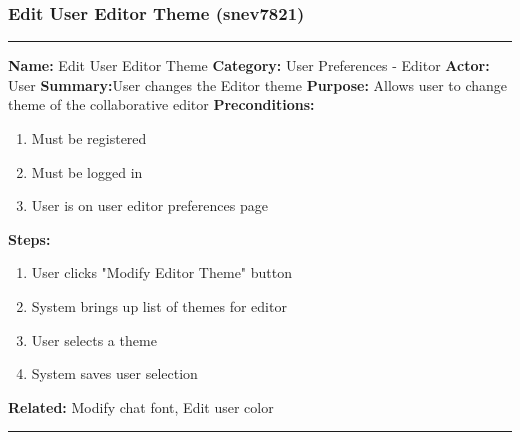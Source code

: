 \documentclass[11pt]{report}
\begin{document}
\subsubsection{Edit User Editor Theme (snev7821)}
\vspace{2pt}
\hrule
\vspace{8pt}
	\noindent\textbf{Name:} Edit User Editor Theme \newline
	\textbf{Category:} User Preferences - Editor  \newline
	\textbf{Actor:} User \newline
	\textbf{Summary:}User changes the Editor theme \newline
	\textbf{Purpose:} Allows user to change theme of the collaborative editor \newline
	\textbf{Preconditions:}
	\begin{enumerate}
		\item Must be registered
		\item Must be logged in
		\item User is on user editor preferences page
	\end{enumerate}
	\textbf{Steps:}
	\begin{enumerate}
		\item User clicks "Modify Editor Theme" button
		\item System brings up list of themes for editor
		\item User selects a theme
		\item System saves user selection
	\end{enumerate}
	\textbf{Related:} Modify chat font, Edit user color
\vspace{8pt}
\hrule
\newpage
\end{document}
